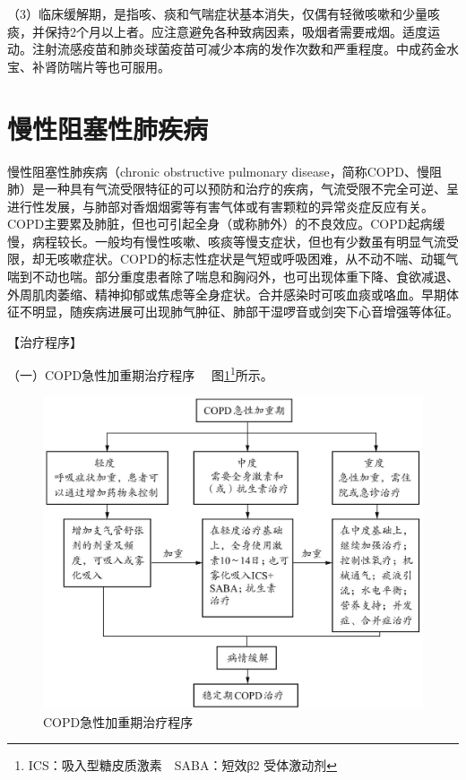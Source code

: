 （3）临床缓解期，是指咳、痰和气喘症状基本消失，仅偶有轻微咳嗽和少量咳痰，并保持2个月以上者。应注意避免各种致病因素，吸烟者需要戒烟。适度运动。注射流感疫苗和肺炎球菌疫苗可减少本病的发作次数和严重程度。中成药金水宝、补肾防喘片等也可服用。

\section{慢性阻塞性肺疾病}

慢性阻塞性肺疾病（chronic obstructive pulmonary
disease，简称COPD、慢阻肺）是一种具有气流受限特征的可以预防和治疗的疾病，气流受限不完全可逆、呈进行性发展，与肺部对香烟烟雾等有害气体或有害颗粒的异常炎症反应有关。COPD主要累及肺脏，但也可引起全身（或称肺外）的不良效应。COPD起病缓慢，病程较长。一般均有慢性咳嗽、咳痰等慢支症状，但也有少数虽有明显气流受限，却无咳嗽症状。COPD的标志性症状是气短或呼吸困难，从不动不喘、动辄气喘到不动也喘。部分重度患者除了喘息和胸闷外，也可出现体重下降、食欲减退、外周肌肉萎缩、精神抑郁或焦虑等全身症状。合并感染时可咳血痰或咯血。早期体征不明显，随疾病进展可出现肺气肿征、肺部干湿啰音或剑突下心音增强等体征。

【治疗程序】

{（一）COPD急性加重期治疗程序} 　图\ref{fig1-4-1}\footnote{ICS：吸入型糖皮质激素　SABA：短效β{2} 受体激动剂}所示。

\begin{figure}[!htbp]
 \centering
 \includegraphics{./images/Image00003.jpg}
 \captionsetup{justification=centering}
 \caption{COPD急性加重期治疗程序}
 \label{fig1-4-1}
  \end{figure} 


